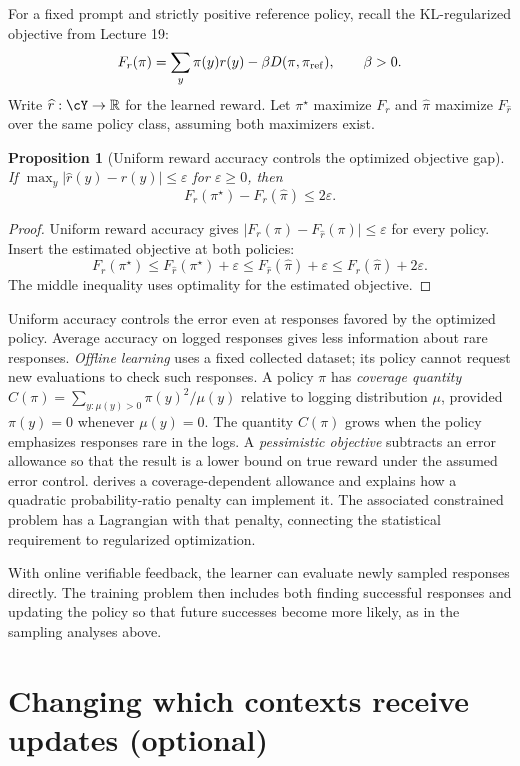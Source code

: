 \documentclass[11pt,twoside]{article}
\newcommand{\R}{\mathbb R}
\newcommand{\KL}{D}
\newtheorem{proposition}[theorem]{Proposition}
\theoremstyle{definition}
\theoremstyle{remark}
\begin{document}
For a fixed prompt and strictly positive reference policy, recall the
KL-regularized objective from Lecture 19:
\[
 F_r(\pi)=\sum_y\pi(y)r(y)-\beta\KL(\pi,\pi_{\rm ref}),\qquad\beta>0.
\]
Write $\widehat r:\cY\to\R$ for the learned reward.
Let $\pi^\star$ maximize $F_r$ and $\widehat\pi$ maximize $F_{\widehat r}$
over the same policy class, assuming both maximizers exist.

\begin{proposition}[Uniform reward accuracy controls the optimized objective gap]
\label{prop:reward-error}
If $\max_y|\widehat r(y)-r(y)|\le\varepsilon$ for $\varepsilon\ge0$, then
\[
 F_r(\pi^\star)-F_r(\widehat\pi)\le2\varepsilon.
\]
\end{proposition}
\begin{proof}
Uniform reward accuracy gives $|F_r(\pi)-F_{\widehat r}(\pi)|\le\varepsilon$
for every policy. Insert the estimated objective at both policies:
\[
 F_r(\pi^\star)\le F_{\widehat r}(\pi^\star)+\varepsilon
 \le F_{\widehat r}(\widehat\pi)+\varepsilon
 \le F_r(\widehat\pi)+2\varepsilon.
\]
The middle inequality uses optimality for the estimated objective.
\end{proof}

Uniform accuracy controls the error even at responses favored by the
optimized policy. Average accuracy on logged responses gives less information
about rare responses. \emph{Offline learning} uses a fixed collected dataset;
its policy cannot request new evaluations to check such responses.
A policy $\pi$ has \emph{coverage quantity}
$C(\pi)=\sum_{y:\mu(y)>0}\pi(y)^2/\mu(y)$ relative to logging
distribution $\mu$, provided $\pi(y)=0$ whenever $\mu(y)=0$.
The quantity $C(\pi)$ grows when the policy emphasizes responses rare in the logs.
A \emph{pessimistic objective} subtracts an error allowance so that the
result is a lower bound on true reward under the assumed error control.
 derives a coverage-dependent allowance and explains
how a quadratic probability-ratio penalty can implement it. The associated
constrained problem has a Lagrangian with that penalty, connecting the
statistical requirement to regularized optimization.

With online verifiable feedback, the learner can evaluate newly sampled
responses directly. The training problem then includes both finding
successful responses and updating the policy so that future successes
become more likely, as in the sampling analyses above.

\section{Changing which contexts receive updates (optional)}
\label{sec:context-weighting}
\end{document}
